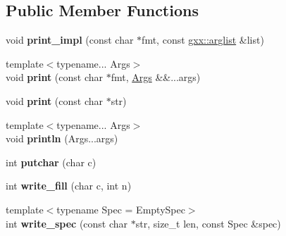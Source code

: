 \subsection*{Public Member Functions}
\begin{DoxyCompactItemize}
\item 
void {\bfseries print\+\_\+impl} (const char $\ast$fmt, const \hyperlink{classgxx_1_1arglist}{gxx\+::arglist} \&list)\hypertarget{classgxx_1_1io_1_1format__writer_a01a3431e84008b5adfda020e874b1fcb}{}\label{classgxx_1_1io_1_1format__writer_a01a3431e84008b5adfda020e874b1fcb}

\item 
{\footnotesize template$<$typename... Args$>$ }\\void {\bfseries print} (const char $\ast$fmt, \hyperlink{structArgs}{Args} \&\&...args)\hypertarget{classgxx_1_1io_1_1format__writer_a8e74d35d303875e1b1c5f2cb0d768a17}{}\label{classgxx_1_1io_1_1format__writer_a8e74d35d303875e1b1c5f2cb0d768a17}

\item 
void {\bfseries print} (const char $\ast$str)\hypertarget{classgxx_1_1io_1_1format__writer_a400643ef00c00601f672569d73882b71}{}\label{classgxx_1_1io_1_1format__writer_a400643ef00c00601f672569d73882b71}

\item 
{\footnotesize template$<$typename... Args$>$ }\\void {\bfseries println} (Args...\+args)\hypertarget{classgxx_1_1io_1_1format__writer_abc83ba815281c94ec2a5c9cd9550de3b}{}\label{classgxx_1_1io_1_1format__writer_abc83ba815281c94ec2a5c9cd9550de3b}

\item 
int {\bfseries putchar} (char c)\hypertarget{classgxx_1_1io_1_1format__writer_a4e4b84faa244ee84f84f9c0bf8107912}{}\label{classgxx_1_1io_1_1format__writer_a4e4b84faa244ee84f84f9c0bf8107912}

\item 
int {\bfseries write\+\_\+fill} (char c, int n)\hypertarget{classgxx_1_1io_1_1format__writer_a926d75097a61a778c425089993efb5f9}{}\label{classgxx_1_1io_1_1format__writer_a926d75097a61a778c425089993efb5f9}

\item 
{\footnotesize template$<$typename Spec  = Empty\+Spec$>$ }\\int {\bfseries write\+\_\+spec} (const char $\ast$str, size\+\_\+t len, const Spec \&spec)\hypertarget{classgxx_1_1io_1_1format__writer_a0a6b5523382a408f3e8a281f42fd9c1f}{}\label{classgxx_1_1io_1_1format__writer_a0a6b5523382a408f3e8a281f42fd9c1f}


\end{DoxyCompactItemize}
